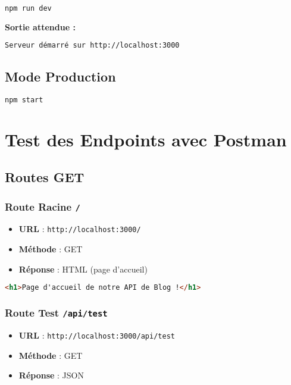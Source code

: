 \documentclass[12pt,a4paper]{article}
\begin{document}
\begin{lstlisting}[language=bash]
npm run dev
\end{lstlisting}

\textbf{Sortie attendue :}
\begin{lstlisting}[language=bash]
Serveur démarré sur http://localhost:3000
\end{lstlisting}

\subsection{Mode Production}

\begin{lstlisting}[language=bash]
npm start
\end{lstlisting}

\section{Test des Endpoints avec Postman}

\subsection{Routes GET}

\subsubsection{Route Racine \texttt{/}}
\begin{itemize}
    \item \textbf{URL} : \texttt{http://localhost:3000/}
    \item \textbf{Méthode} : GET
    \item \textbf{Réponse} : HTML (page d'accueil)
\end{itemize}

\begin{lstlisting}[language=html]
<h1>Page d'accueil de notre API de Blog !</h1>
\end{lstlisting}

\subsubsection{Route Test \texttt{/api/test}}
\begin{itemize}
    \item \textbf{URL} : \texttt{http://localhost:3000/api/test}
    \item \textbf{Méthode} : GET
    \item \textbf{Réponse} : JSON
\end{itemize}
\end{document}
